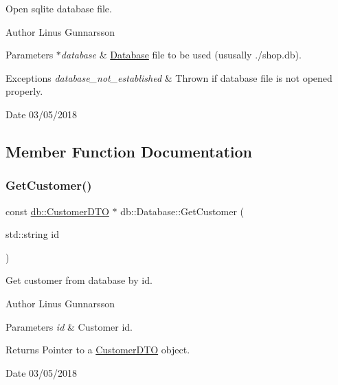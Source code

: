 Open sqlite database file. \begin{DoxyAuthor}{Author}
Linus Gunnarsson 
\end{DoxyAuthor}

\begin{DoxyParams}{Parameters}
{\em $\ast$database} & \mbox{\hyperlink{classdb_1_1Database}{Database}} file to be used (ususally \textquotesingle{}./shop.db\textquotesingle{}). \\
\hline
\end{DoxyParams}

\begin{DoxyExceptions}{Exceptions}
{\em database\+\_\+not\+\_\+established} & Thrown if database file is not opened properly. \\
\hline
\end{DoxyExceptions}
\begin{DoxyDate}{Date}
03/05/2018 
\end{DoxyDate}


\subsection{Member Function Documentation}
\mbox{\label{classdb_1_1Database_a50871011cdeb0a80894f08549240c3fa}} 
\subsubsection{\texorpdfstring{Get\+Customer()}{GetCustomer()}}
{\footnotesize\ttfamily const \mbox{\hyperlink{classdb_1_1CustomerDTO}{db\+::\+Customer\+D\+TO}} $\ast$ db\+::\+Database\+::\+Get\+Customer (\begin{DoxyParamCaption}\item[{std\+::string}]{id }\end{DoxyParamCaption})}

Get customer from database by id. \begin{DoxyAuthor}{Author}
Linus Gunnarsson 
\end{DoxyAuthor}

\begin{DoxyParams}{Parameters}
{\em id} & Customer id. \\
\hline
\end{DoxyParams}
\begin{DoxyReturn}{Returns}
Pointer to a \mbox{\hyperlink{classdb_1_1CustomerDTO}{Customer\+D\+TO}} object. 
\end{DoxyReturn}
\begin{DoxyDate}{Date}
03/05/2018 
\end{DoxyDate}
\mbox{\label{classdb_1_1Database_a1fb85ca95813c5b08fa337ee876dcc77}} 
